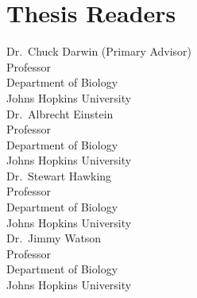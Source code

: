 %
\lipsum[1-4]
%
\section*{Thesis Readers}
\begin{singlespace}
%
\noindent Dr.~Chuck Darwin (Primary Advisor)\\
\indent \indent Professor\\
\indent \indent Department of Biology\\
\indent \indent Johns Hopkins University\\

\noindent Dr.~Albrecht Einstein\\
\indent \indent Professor\\
\indent \indent Department of Biology\\
\indent \indent Johns Hopkins University\\

\noindent Dr.~Stewart Hawking\\
\indent \indent Professor\\
\indent \indent Department of Biology\\
\indent \indent Johns Hopkins University\\

\noindent Dr.~Jimmy Watson\\
\indent \indent Professor\\
\indent \indent Department of Biology\\
\indent \indent Johns Hopkins University\\
%
%
\end{singlespace}